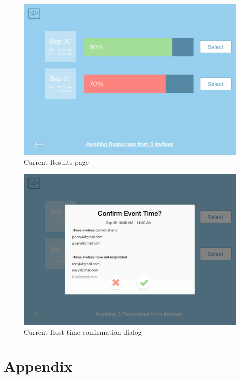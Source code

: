 \documentclass{sigchi}
\begin{document}
\begin{figure}
  \centering
  \includegraphics[width=1.75\columnwidth]{Mockup/Results}
  \caption{Current Results page}
\end{figure}

\begin{figure}
  \centering
  \includegraphics[width=1.75\columnwidth]{Mockup/ResultsSelectDialog}
  \caption{Current Host time confirmation dialog}
\end{figure}
\FloatBarrier

\balance{}
\newpage




\section{Appendix}
\end{document}
